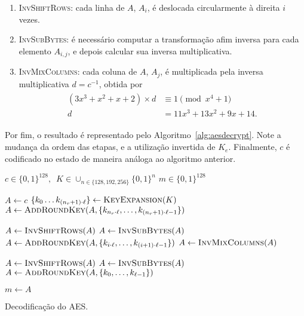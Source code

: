 \documentclass{ufsctex/ufsctex}
\newcommand{\binwds}[1]{\{0, 1\}^{#1}}
\begin{document}
\begin{enumerate}[labelsep=0.5em, label=\roman*.]

  \item \textsc{InvShiftRows}: cada linha de $A$, $A_{i}$, é deslocada
      circularmente à direita $i$ vezes.

  \item \textsc{InvSubBytes}: é necessário computar a transformação afim
      inversa para cada elemento $A_{i, j}$, e depois calcular sua inversa
        multiplicativa.

  \item \textsc{InvMixColumns}: cada coluna de $A$, $A_{j}$, é multiplicada pela
      inversa multiplicativa $d = c^{-1}$, obtida por
        \begin{align}
          \begin{split}
            (3 x^{3} + x^{2} + x + 2) \times d &\equiv 1 \pmod{x^{4} + 1} \\
            d &= 11 x^{3} + 13 x^{2} + 9 x + 14.
          \end{split}
        \end{align}

\end{enumerate}

Por fim, o resultado é representado pelo Algoritmo~\ref{alg:aesdecrypt}. Note a
mudança da ordem das etapas, e a utilização invertida de $K_{e}$. Finalmente,
$c$ é codificado no estado de maneira análoga ao algoritmo anterior.

\begin{algorithm}
  \begin{algorithmic}
    \REQUIRE{}  $c \in \binwds{128}, \enspace
      K \in \cup_{n \in \{128, 192, 256\}} \binwds{n}$
    \ENSURE{}  $m \in \binwds{128}$ 

    \STATE{}  $A \leftarrow c$
    \STATE{}  $\{k_{0} \dots k_{(n_{r} + 1) \cdot \ell}\}
      \leftarrow \textsc{KeyExpansion}(K)$
    \STATE{}  $A \leftarrow \textsc{AddRoundKey}(A,
      \{k_{n_{r} \cdot \ell}, \dots, k_{(n_{r} + 1) \cdot \ell - 1}\})$

      \STATE{}  $A \leftarrow \textsc{InvShiftRows}(A)$
      \STATE{}  $A \leftarrow \textsc{InvSubBytes}(A)$
      \STATE{}  $A \leftarrow \textsc{AddRoundKey}(A,
        \{k_{i \cdot \ell}, \dots, k_{(i + 1) \cdot \ell - 1}\})$
      \STATE{}  $A \leftarrow \textsc{InvMixColumns}(A)$
    \ENDFOR{}

    \STATE{}  $A \leftarrow \textsc{InvShiftRows}(A)$
    \STATE{}  $A \leftarrow \textsc{InvSubBytes}(A)$
    \STATE{}  $A \leftarrow \textsc{AddRoundKey}(A,
      \{k_{0}, \dots, k_{\ell - 1}\})$

    \STATE{}  $m \leftarrow A$
  \end{algorithmic}
  \caption{Decodificação do AES.}\label{alg:aesdecrypt}
\end{algorithm}
\end{document}
